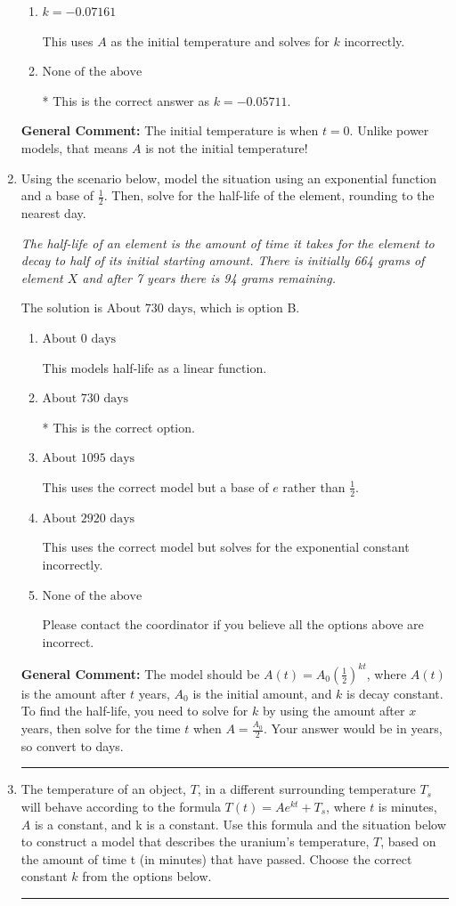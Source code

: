\documentclass{extbook}[14pt]
\newcommand{\litem}[1]{\item #1

\rule{\textwidth}{0.4pt}}
\begin{document}
\begin{enumerate}
{\begin{enumerate}[label=\Alph*.]
This uses $A$ as the initial temperature and solves for $k$ correctly.
\item \( k = -0.07161 \)

This uses $A$ as the initial temperature and solves for $k$ incorrectly.
\item \( \text{None of the above} \)

* This is the correct answer as $k = -0.05711$.
\end{enumerate}

\textbf{General Comment:} The initial temperature is when $t = 0$. Unlike power models, that means $A$ is not the initial temperature!
}
\litem{
Using the scenario below, model the situation using an exponential function and a base of $\frac{1}{2}$. Then, solve for the half-life of the element, rounding to the nearest day.

\begin{center}
    \textit{ The half-life of an element is the amount of time it takes for the element to decay to half of its initial starting amount. There is initially 664 grams of element $X$ and after 7 years there is 94 grams remaining. }
\end{center}
The solution is \( \text{About } 730 \text{ days} \), which is option B.\begin{enumerate}[label=\Alph*.]
\item \( \text{About } 0 \text{ days} \)

This models half-life as a linear function.
\item \( \text{About } 730 \text{ days} \)

* This is the correct option.
\item \( \text{About } 1095 \text{ days} \)

This uses the correct model but a base of $e$ rather than $\frac{1}{2}$.
\item \( \text{About } 2920 \text{ days} \)

This uses the correct model but solves for the exponential constant incorrectly.
\item \( \text{None of the above} \)

Please contact the coordinator if you believe all the options above are incorrect.
\end{enumerate}

\textbf{General Comment:} The model should be $A(t) = A_0 (\frac{1}{2})^{kt}$, where $A(t)$ is the amount after $t$ years, $A_0$ is the initial amount, and $k$ is decay constant. To find the half-life, you need to solve for $k$ by using the amount after $x$ years, then solve for the time $t$ when $A = \frac{A_0}{2}$. Your answer would be in years, so convert to days.
}
\litem{
The temperature of an object, $T$, in a different surrounding temperature $T_s$ will behave according to the formula $T(t) = Ae^{kt} + T_s$, where $t$ is minutes, $A$ is a constant, and k is a constant. Use this formula and the situation below to construct a model that describes the uranium's temperature, $T$, based on the amount of time t (in minutes) that have passed. Choose the correct constant $k$ from the options below.

}
\end{enumerate}
\end{document}
